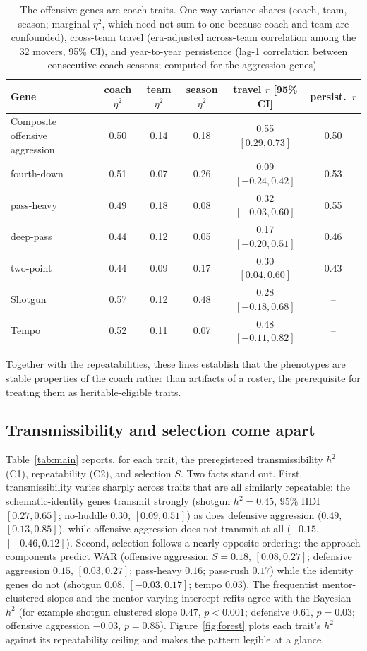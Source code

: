 \documentclass[11pt]{article}
\begin{document}
\begin{table}[t]
\centering
\caption{The offensive genes are coach traits. One-way variance shares (coach, team,
season; marginal $\eta^2$, which need not sum to one because coach and team are
confounded), cross-team travel (era-adjusted across-team correlation among the 32
movers, 95\% CI), and year-to-year persistence (lag-1 correlation between consecutive
coach-seasons; computed for the aggression genes).}
\label{tab:validity}
\begin{tabular}{lccccc}
\toprule
Gene & coach $\eta^2$ & team $\eta^2$ & season $\eta^2$ & travel $r$ [95\% CI] & persist.\ $r$ \\
\midrule
Composite offensive aggression & 0.50 & 0.14 & 0.18 & 0.55 $[0.29,0.73]$ & 0.50 \\
\quad fourth-down & 0.51 & 0.07 & 0.26 & 0.09 $[-0.24,0.42]$ & 0.53 \\
\quad pass-heavy  & 0.49 & 0.18 & 0.08 & 0.32 $[-0.03,0.60]$ & 0.55 \\
\quad deep-pass   & 0.44 & 0.12 & 0.05 & 0.17 $[-0.20,0.51]$ & 0.46 \\
\quad two-point   & 0.44 & 0.09 & 0.17 & 0.30 $[0.04,0.60]$ & 0.43 \\
Shotgun & 0.57 & 0.12 & 0.48 & 0.28 $[-0.18,0.68]$ & -- \\
Tempo   & 0.52 & 0.11 & 0.07 & 0.48 $[-0.11,0.82]$ & -- \\
\bottomrule
\end{tabular}
\end{table}

Together with the repeatabilities, these lines establish that the phenotypes are
stable properties of the coach rather than artifacts of a roster, the prerequisite
for treating them as heritable-eligible traits.

\subsection{Transmissibility and selection come apart}
Table~\ref{tab:main} reports, for each trait, the preregistered transmissibility
$h^{2}$ (C1), repeatability (C2), and selection $S$. Two facts stand out. First,
transmissibility varies sharply across traits that are all similarly repeatable:
the schematic-identity genes transmit strongly (shotgun $h^{2}=0.45$, 95\% HDI
$[0.27,0.65]$; no-huddle $0.30$, $[0.09,0.51]$) as does defensive aggression
($0.49$, $[0.13,0.85]$), while offensive aggression does not transmit at all
($-0.15$, $[-0.46,0.12]$). Second, selection follows a nearly opposite ordering:
the approach components predict WAR (offensive aggression $S=0.18$, $[0.08,0.27]$;
defensive aggression $0.15$, $[0.03,0.27]$; pass-heavy $0.16$; pass-rush $0.17$)
while the identity genes do not (shotgun $0.08$, $[-0.03,0.17]$; tempo $0.03$). The
frequentist mentor-clustered slopes and the mentor varying-intercept refits agree
with the Bayesian $h^{2}$ (for example shotgun clustered slope $0.47$, $p<0.001$;
defensive $0.61$, $p=0.03$; offensive aggression $-0.03$, $p=0.85$).
Figure~\ref{fig:forest} plots each trait's $h^{2}$ against its repeatability ceiling
and makes the pattern legible at a glance.
\end{document}
